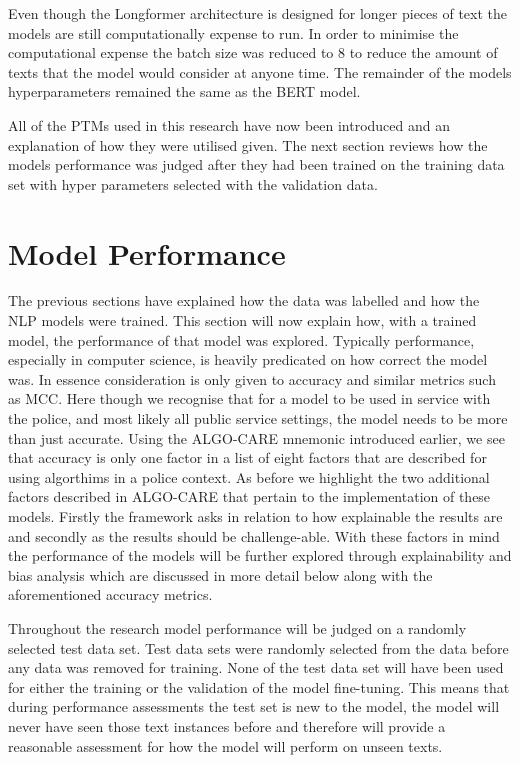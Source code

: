 Even though the Longformer architecture is designed for longer pieces of text the models are still computationally expense to run. In order to minimise the computational expense the batch size was reduced to 8 to reduce the amount of texts that the model would consider at anyone time. The remainder of the models hyperparameters remained the same as the BERT model.

All of the PTMs used in this research have now been introduced and an explanation of how they were utilised given. The next section reviews how the models performance was judged after they had been trained on the training data set with hyper parameters selected with the validation data.


\section{Model Performance} The previous sections have explained how the data was labelled and how the NLP models were trained. This section will now explain how, with a trained model, the performance of that model was explored. Typically performance, especially in computer science, is heavily predicated on how correct the model was. In essence consideration is only given to accuracy and similar metrics such as MCC. Here though we recognise that for a model to be used in service with the police, and most likely all public service settings, the model needs to be more than just accurate. Using the ALGO-CARE mnemonic introduced earlier, we see that accuracy is only one factor in a list of eight factors that are described for using algorthims in a police context. As before we highlight  the two additional factors described in ALGO-CARE that pertain to the implementation of these models. Firstly the framework asks  in relation to how explainable the results are and secondly   as the results should be challenge-able. With these factors in mind the performance of the models will be further explored through explainability and bias analysis which are discussed in more detail below along with the aforementioned accuracy metrics.

Throughout the research model performance will be judged on a randomly selected test data set. Test data sets were randomly selected from the data before any data was removed for training. None of the test data set will have been used for either the training or the validation of the model fine-tuning. This means that during performance assessments the test set is new to the model, the model will never have seen those text instances before and therefore will provide a reasonable assessment for how the model will perform on unseen texts. 

